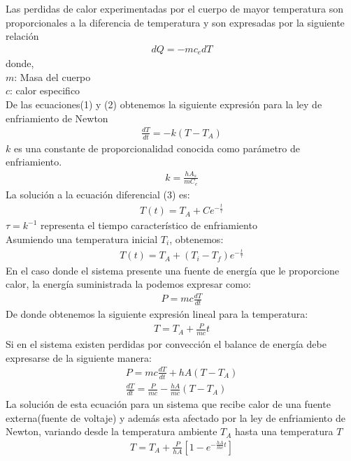 \documentclass{article}
\begin{document}
Las perdidas de calor experimentadas por el cuerpo de mayor temperatura son proporcionales a la diferencia de temperatura y son expresadas por la siguiente relación 
\begin{align}
    dQ = -mc_edT
\end{align}
donde, \\ 
$m$: Masa del cuerpo \\ 
$c$: calor especifico \\ 
De las ecuaciones(1) y (2) obtenemos la siguiente expresión para la ley de enfriamiento de Newton 
\begin{align}
    \frac{dT}{dt} = -k(T-T_A)
\end{align}
$k$ es una constante de proporcionalidad conocida como parámetro de enfriamiento. 
\begin{align}
    k = \frac{hA_s}{mC_e}
\end{align}
La solución a la ecuación diferencial (3) es: 
\begin{align}
    T(t) = T_A + Ce^{-\frac{t}{\tau}}
\end{align}
$\tau = k^{-1}$ representa el tiempo característico de enfriamiento \\ 
Asumiendo una temperatura inicial $T_i$, obtenemos: 
\begin{align}
    T(t) = T_A + (T_i-T_f)e^{-\frac{t}{\tau}}
\end{align}
En el caso donde el sistema presente una fuente de energía que le proporcione calor, la energía suministrada la podemos expresar como: 
\begin{align}
    P = mc\frac{dT}{dt}
\end{align}
De donde obtenemos la siguiente expresión lineal para la temperatura: 
\begin{align}
    T =  T_A + \frac{P}{mc}t
\end{align}
Si en el sistema existen perdidas por convección el balance de energía debe expresarse de la siguiente manera: 
\begin{align}
    P = mc \frac{dT}{dt} + hA(T-T_A) \\ 
    \frac{dT}{dt} = \frac{P}{mc} - \frac{hA}{mc}(T-T_A)
\end{align}
La solución de esta ecuación para un sistema que recibe calor de una fuente externa(fuente de voltaje) y además esta afectado por la ley de enfriamiento de Newton, variando desde la temperatura ambiente $T_A$ hasta una temperatura $T$
\begin{align}
    T = T_A +\frac{P}{hA}[1-e^{-\frac{hA}{mc}t}]
\end{align}
\end{document}
